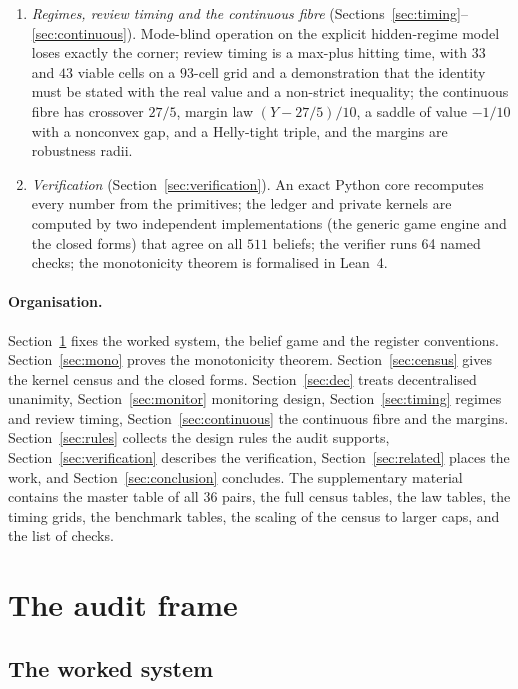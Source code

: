 \documentclass[11pt,a4paper]{article}
\theoremstyle{plain}
\theoremstyle{definition}
\theoremstyle{remark}
\newcommand{\NCHECKS}{64}
\begin{document}
\begin{enumerate}[leftmargin=2em,itemsep=1pt]
\item \emph{Regimes, review timing and the continuous fibre} (Sections~\ref{sec:timing}--\ref{sec:continuous}). Mode-blind operation on the explicit hidden-regime model loses exactly the corner; review timing is a max-plus hitting time, with $33$ and $43$ viable cells on a $93$-cell grid and a demonstration that the identity must be stated with the real value and a non-strict inequality; the continuous fibre has crossover $27/5$, margin law $(Y-27/5)/10$, a saddle of value $-1/10$ with a nonconvex gap, and a Helly-tight triple, and the margins are robustness radii.
\item \emph{Verification} (Section~\ref{sec:verification}). An exact Python core recomputes every number from the primitives; the ledger and private kernels are computed by two independent implementations (the generic game engine and the closed forms) that agree on all $511$ beliefs; the verifier runs \NCHECKS{} named checks; the monotonicity theorem is formalised in Lean~4.
\end{enumerate}

\paragraph{Organisation.}
Section~\ref{sec:frame} fixes the worked system, the belief game and the register conventions. Section~\ref{sec:mono} proves the monotonicity theorem. Section~\ref{sec:census} gives the kernel census and the closed forms. Section~\ref{sec:dec} treats decentralised unanimity, Section~\ref{sec:monitor} monitoring design, Section~\ref{sec:timing} regimes and review timing, Section~\ref{sec:continuous} the continuous fibre and the margins. Section~\ref{sec:rules} collects the design rules the audit supports, Section~\ref{sec:verification} describes the verification, Section~\ref{sec:related} places the work, and Section~\ref{sec:conclusion} concludes. The supplementary material contains the master table of all $36$ pairs, the full census tables, the law tables, the timing grids, the benchmark tables, the scaling of the census to larger caps, and the list of checks.
\section{The audit frame}\label{sec:frame}

\subsection{The worked system}\label{sec:system}
\end{document}

